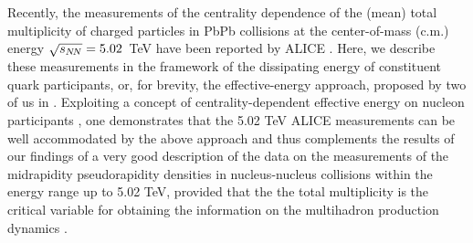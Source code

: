 \documentclass[twocolumn,showpacs,preprintnumbers,prd,superscriptaddress,nofootinbib]{revtex4}
\begin{document}

Recently, the measurements 
of the
centrality dependence of the (mean) total multiplicity of charged 
 particles in PbPb collisions 
 at 
the center-of-mass (c.m.) energy
 $\sqrt{s_{N\!N}}=5.02$~TeV
 have been reported 
 by
 ALICE 
.
 Here, we describe these measurements in the framework of the dissipating 
energy of constituent quark participants, or, for brevity, the 
effective-energy approach, proposed by two of us in . 
Exploiting a 
concept of centrality-dependent effective energy on nucleon participants 
,
 one demonstrates that the 5.02 TeV ALICE measurements can be well 
accommodated by the above approach and thus complements the results of our 
findings  
 of 
 a very good
description of the data on the measurements of the 
midrapidity pseudorapidity densities in nucleus-nucleus collisions within 
the energy range up to 5.02 TeV, provided that the the total multiplicity 
is the critical variable for obtaining the information on the 
multihadron production 
dynamics .  
 
\end{document}
